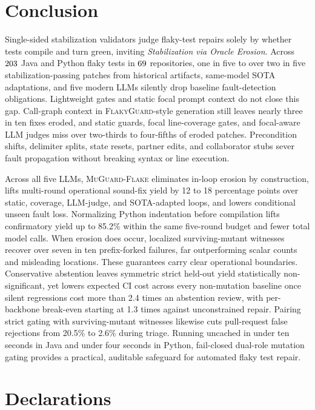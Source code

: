 \section{Conclusion}
\label{sec:conclusion}

Single-sided stabilization validators judge flaky-test repairs solely by whether tests compile and turn green, inviting \emph{Stabilization via Oracle Erosion}. Across $203$ Java and Python flaky tests in $69$ repositories, one in five to over two in five stabilization-passing patches from historical artifacts, same-model SOTA adaptations, and five modern LLMs silently drop baseline fault-detection obligations. Lightweight gates and static focal prompt context do not close this gap. Call-graph context in \textsc{FlakyGuard}-style generation still leaves nearly three in ten fixes eroded, and static guards, focal line-coverage gates, and focal-aware LLM judges miss over two-thirds to four-fifths of eroded patches. Precondition shifts, delimiter splits, state resets, partner edits, and collaborator stubs sever fault propagation without breaking syntax or line execution.

Across all five LLMs, \textsc{MuGuard-Flake} eliminates in-loop erosion by construction, lifts multi-round operational sound-fix yield by 12 to 18 percentage points over static, coverage, LLM-judge, and SOTA-adapted loops, and lowers conditional unseen fault loss. Normalizing Python indentation before compilation lifts confirmatory yield up to 85.2\% within the same five-round budget and fewer total model calls. When erosion does occur, localized surviving-mutant witnesses recover over seven in ten prefix-forked failures, far outperforming scalar counts and misleading locations. These guarantees carry clear operational boundaries. Conservative abstention leaves symmetric strict held-out yield statistically non-significant, yet lowers expected CI cost across every non-mutation baseline once silent regressions cost more than 2.4 times an abstention review, with per-backbone break-even starting at 1.3 times against unconstrained repair. Pairing strict gating with surviving-mutant witnesses likewise cuts pull-request false rejections from 20.5\% to 2.6\% during triage. Running uncached in under ten seconds in Java and under four seconds in Python, fail-closed dual-role mutation gating provides a practical, auditable safeguard for automated flaky test repair.

\section*{Declarations}

